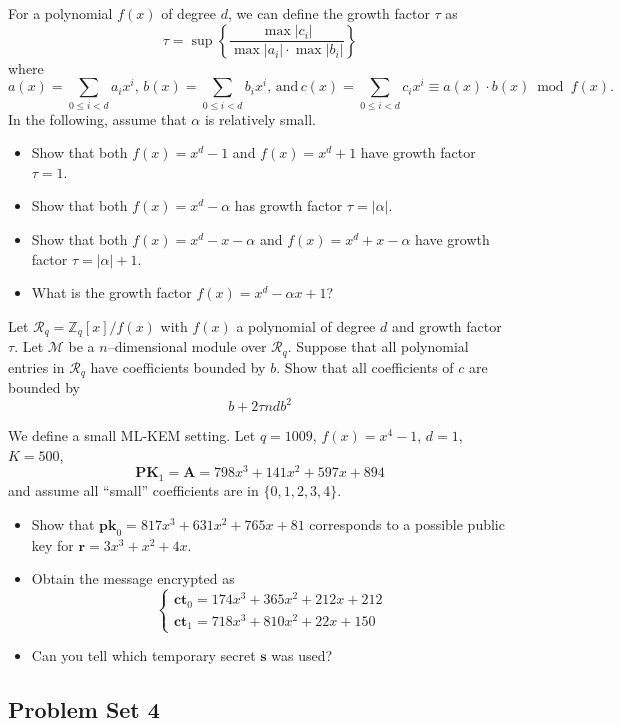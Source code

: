 \begin{exercise}
  For a polynomial $f(x)$ of degree $d$, we can define the growth factor $\tau$ as \[
    \tau = \sup\left\{\dfrac{\max{|c_{i}|}}{\max{|a_{i}|}\cdot \max{|b_{i}|}}\right\}
\]
where \[
  a(x) = \displaystyle\sum_{0 \le i < d}a_{i}x^{i},\, b(x) = \displaystyle\sum_{0 \le i < d}b_{i} x^{i},\, \text{and}\, c(x) = \displaystyle\sum_{0 \le i < d}c_{i}x^{i} \equiv a(x) \cdot b(x) \bmod{f(x)}.\]
In the following, assume that $\alpha$ is relatively small.

\begin{itemize}
  \item Show that both $f(x) = x^{d} - 1$ and $f(x) = x^{d} + 1$ have growth factor $\tau = 1$.
  \item Show that both $f(x) = x^{d} - \alpha$ has growth factor $\tau = |\alpha|$.
  \item Show that both $f(x) = x^{d} - x - \alpha$ and $f(x) = x^{d} + x - \alpha$ have growth factor $\tau = |\alpha| + 1$.
  \item What is the growth factor $f(x) = x^{d} - \alpha x + 1$?
\end{itemize}

\end{exercise}

\begin{solution}
  
\end{solution}

\begin{exercise}
  Let $\mathcal{R}_{q} = \mathbb{Z}_{q}[x]/f(x)$ with $f(x)$ a polynomial of degree $d$ and growth factor $\tau$.
  Let $\mathcal{M}$ be a $n$--dimensional module over $\mathcal{R}_{q}$.
  Suppose that all polynomial entries in $\mathcal{R}_{q}$ have coefficients bounded by $b$. Show that all coefficients of $c$ are bounded by \[
  b + 2\tau n d b^{2}
  \]
\end{exercise}

\begin{exercise}
  We define a small ML-KEM setting. Let $q = 1009$, $f(x) = x^{4} - 1$, $d = 1$, $K = 500$,\[
    \mathbf{PK}_{1} = \mathbf{A} = 798x^{3} + 141x^{2} + 597x + 894
    \]
    and assume all ``small'' coefficients are in $\{0,1,2,3,4\}$.
    \begin{itemize}
      \item Show that $\mathbf{pk}_{0} = 817x^{3} + 631x^{2} + 765x + 81$ corresponds to a possible public key for $\mathbf{r} = 3x^{3} + x^{2} + 4x$.
      \item Obtain the message encrypted as \[
      \begin{cases}
        \mathbf{ct}_{0} = 174x^{3} + 365x^{2} + 212x + 212\\ 
        \mathbf{ct}_{1} = 718x^{3} + 810x^{2} + 22x + 150
      \end{cases}
      \]

      \item Can you tell which temporary secret $\mathbf{s}$ was used?
    \end{itemize}
\end{exercise}

\subsection{Problem Set 4}\label{subsec: lat-ps4}
